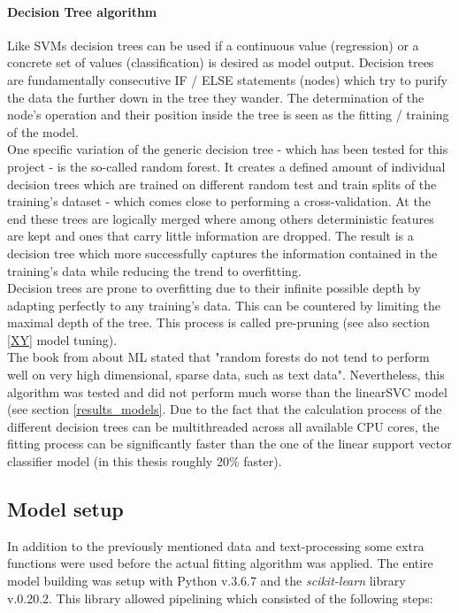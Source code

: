 \paragraph{Decision Tree algorithm}
Like SVMs decision trees can be used if a continuous value (regression) or a concrete set of values (classification) is desired as model output. Decision trees are fundamentally consecutive IF / ELSE statements (nodes) which try to purify the data the further down in the tree they wander. The determination of the node's operation and their position inside the tree is seen as the fitting / training of the model.\\
One specific variation of the generic decision tree - which has been tested for this project - is the so-called random forest. It creates a defined amount of individual decision trees which are trained on different random test and train splits of the training's dataset - which comes close to performing a cross-validation. At the end these trees are logically merged where among others deterministic features are kept and ones that carry little information are dropped. The result is a decision tree which more successfully captures the information contained in the training's data while reducing the trend to overfitting.\\
Decision trees are prone to overfitting due to their infinite possible depth by adapting perfectly to any training's data. This can be countered by limiting the maximal depth of the tree. This process is called pre-pruning (see also section \ref{XY} model tuning).\\
\newline
 The book from \parencite{Guido2016} about ML stated that "random forests do not tend to perform well on very high dimensional, sparse data, such as text data". Nevertheless, this algorithm was tested and did not perform much worse than the linearSVC model (see section \ref{results_models}. Due to the fact that the calculation process of the different decision trees can be multithreaded across all available CPU cores, the fitting process can be significantly faster than the one of the linear support vector classifier model (in this thesis roughly 20\% faster). 

\subsection{Model setup} \label{model_setup}
In addition to the previously mentioned data and text-processing some extra functions were used before the actual fitting algorithm was applied. The entire model building was setup with Python v.3.6.7 and the \textit{scikit-learn} library v.0.20.2. This library \parencite{2018Scikit-learnExtraction} allowed pipelining which consisted of the following steps:

